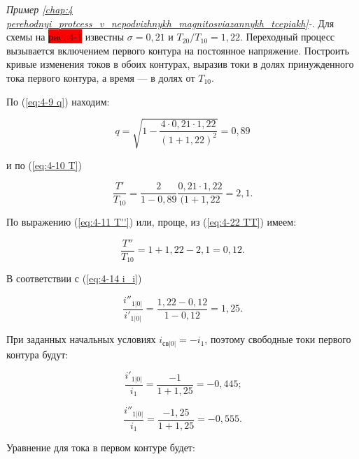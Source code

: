 \begin{small} %

    \vspace{1pc}    
    \label{ex:4-1}
	\textit{Пример \ref*{chap:4 perehodnyi_protcess_v_nepodvizhnykh_magnitosviazannykh_tcepiakh}-}. Для схемы на \colorbox{red}{рис. 4-1} известны $ \sigma = 0,21 $ и $ T_{20} / T_{10} = 1,22 $. Переходный процесс вызывается включением первого контура на постоянное напряжение. Построить кривые изменения токов в обоих контурах, выразив токи в долях принужденного тока первого контура, а время — в долях от $ T_{10} $.
	
	По (\ref{eq:4-9 q}) находим:
	
	\begin{equation*}    
        q=\sqrt{1-\frac{4 \cdot 0,21 \cdot 1,22 }{(1+1,22)^2}}=0,89
    \end{equation*}
    
    и по (\ref{eq:4-10 T})
    
    \begin{equation*}    
        \frac{T'}{T_{10}}=\frac{2}{1-0,89}\frac{0,21 \cdot 1,22}{(1+1,22}=2,1\text{.}
    \end{equation*}
	
	По выражению (\ref{eq:4-11 T''}) или, проще, из (\ref{eq:4-22 TT}) имеем:
	
	\begin{equation*}    
        \frac{T''}{T_{10}}=1+1,22-2,1=0,12\text{.}
    \end{equation*}
    
    В соответствии с (\ref{eq:4-14 i_i})
    
    \begin{equation*}    
        \frac{i''_{1|0|}}{i'_{1|0|}} = \frac{1,22-0,12}{1-0,12} = 1,25\text{.}
    \end{equation*}
	
	При заданных начальных условиях $ i_{св|0|}=-i_1 $, поэтому свободные токи первого контура будут:
	
	\begin{equation*}    
        \frac{i'_{1|0|}}{i_1}=\frac{-1}{1+1,25}=-0,445\text{;}
    \end{equation*}
	
	\begin{equation*}    
        \frac{i''_{1|0|}}{i_1}=\frac{-1,25}{1+1,25}=-0,555\text{.}
    \end{equation*}
	
	Уравнение для тока в первом контуре будет:
	

\end{small}
